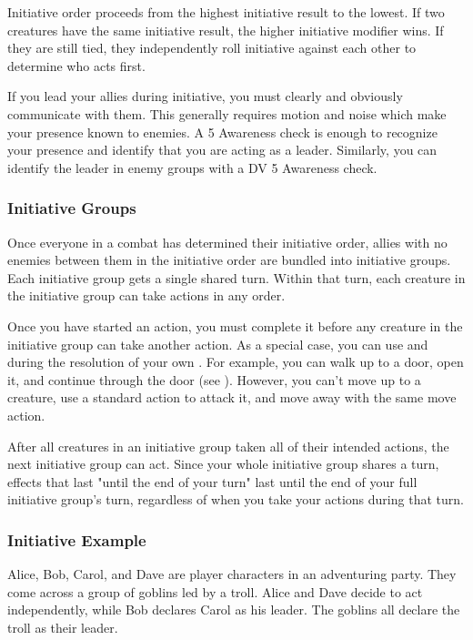     Initiative order proceeds from the highest initiative result to the lowest.
    If two creatures have the same initiative result, the higher initiative modifier wins.
    If they are still tied, they independently roll initiative against each other to determine who acts first.

    If you lead your allies during initiative, you must clearly and obviously communicate with them.
    This generally requires motion and noise which make your presence known to enemies.
    A  5 Awareness check is enough to recognize your presence and identify that you are acting as a leader.
    Similarly, you can identify the leader in enemy groups with a DV 5 Awareness check.

    \subsubsection{Initiative Groups}\label{Initiative Groups}
      Once everyone in a combat has determined their initiative order, allies with no enemies between them in the initiative order are bundled into initiative groups.
      Each initiative group gets a single shared turn.
      Within that turn, each creature in the initiative group can take actions in any order.

      Once you have started an action, you must complete it before any creature in the initiative group can take another action.
      As a special case, you can use  and  during the resolution of your own .
      For example, you can walk up to a door, open it, and continue through the door (see ).
      However, you can't move up to a creature, use a standard action to attack it, and move away with the same move action.

      After all creatures in an initiative group taken all of their intended actions, the next initiative group can act.
      Since your whole initiative group shares a turn, effects that last "until the end of your turn" last until the end of your full initiative group's turn, regardless of when you take your actions during that turn.

    \subsubsection{Initiative Example}
      Alice, Bob, Carol, and Dave are player characters in an adventuring party.
      They come across a group of goblins led by a troll.
      Alice and Dave decide to act independently, while Bob declares Carol as his leader.
      The goblins all declare the troll as their leader.

